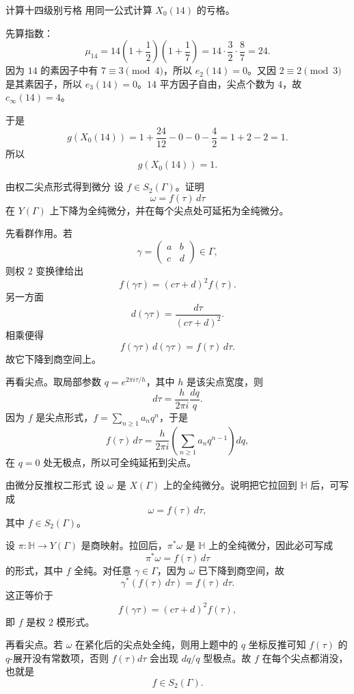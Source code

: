 \begin{problem}{计算十四级别亏格}
\easy
用同一公式计算 $X_0(14)$ 的亏格。
\end{problem}
\begin{solution}
先算指数：
\[
\mu_{14}=14\left(1+\frac12\right)\left(1+\frac17\right)=14\cdot\frac32\cdot\frac87=24.
\]
因为 $14$ 的素因子中有 $7\equiv3\pmod4$，所以 $e_2(14)=0$。又因 $2\equiv2\pmod3$ 是其素因子，所以 $e_3(14)=0$。$14$ 平方因子自由，尖点个数为 $4$，故 $c_\infty(14)=4$。

于是
\[
g(X_0(14))=1+\frac{24}{12}-0-0-\frac42=1+2-2=1.
\]
所以
\[
g(X_0(14))=1.
\]
\end{solution}

\begin{problem}{由权二尖点形式得到微分}
\easy
设 $f\in S_2(\Gamma)$。证明
\[
\omega=f(\tau)\,d\tau
\]
在 $Y(\Gamma)$ 上下降为全纯微分，并在每个尖点处可延拓为全纯微分。
\end{problem}
\begin{solution}
先看群作用。若
\[
\gamma=\begin{pmatrix}a&b\\c&d\end{pmatrix}\in\Gamma,
\]
则权 $2$ 变换律给出
\[
f(\gamma\tau)=(c\tau+d)^2f(\tau).
\]
另一方面
\[
d(\gamma\tau)=\frac{d\tau}{(c\tau+d)^2}.
\]
相乘便得
\[
f(\gamma\tau)\,d(\gamma\tau)=f(\tau)\,d\tau.
\]
故它下降到商空间上。

再看尖点。取局部参数 $q=e^{2\pi i\tau/h}$，其中 $h$ 是该尖点宽度，则
\[
d\tau=\frac{h}{2\pi i}\frac{dq}{q}.
\]
因为 $f$ 是尖点形式，$f=\sum_{n\ge1}a_nq^n$，于是
\[
f(\tau)\,d\tau=\frac{h}{2\pi i}\left(\sum_{n\ge1}a_nq^{n-1}\right)dq,
\]
在 $q=0$ 处无极点，所以可全纯延拓到尖点。
\end{solution}

\begin{problem}{由微分反推权二形式}
\easy
设 $\omega$ 是 $X(\Gamma)$ 上的全纯微分。说明把它拉回到 $\mathbb H$ 后，可写成
\[
\omega=f(\tau)\,d\tau,
\]
其中 $f\in S_2(\Gamma)$。
\end{problem}
\begin{solution}
设 $\pi:\mathbb H\to Y(\Gamma)$ 是商映射。拉回后，$\pi^*\omega$ 是 $\mathbb H$ 上的全纯微分，因此必可写成
\[
\pi^*\omega=f(\tau)\,d\tau
\]
的形式，其中 $f$ 全纯。对任意 $\gamma\in\Gamma$，因为 $\omega$ 已下降到商空间，故
\[
\gamma^*(f(\tau)\,d\tau)=f(\tau)\,d\tau.
\]
这正等价于
\[
f(\gamma\tau)=(c\tau+d)^2f(\tau),
\]
即 $f$ 是权 $2$ 模形式。

再看尖点。若 $\omega$ 在紧化后的尖点处全纯，则用上题中的 $q$ 坐标反推可知 $f(\tau)$ 的 $q$-展开没有常数项，否则 $f(\tau)d\tau$ 会出现 $dq/q$ 型极点。故 $f$ 在每个尖点都消没，也就是
\[
f\in S_2(\Gamma).
\]
\end{solution}

